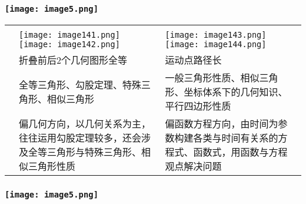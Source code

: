 \hypertarget{ux5b66ux79d1ux7f51www.zxxk.com--ux6559ux80b2ux8d44ux6e90ux95e8ux6237ux63d0ux4f9bux8bd5ux9898ux8bd5ux5377ux6559ux6848ux8bfeux4ef6ux6559ux5b66ux8bbaux6587ux7d20ux6750ux7b49ux5404ux7c7bux6559ux5b66ux8d44ux6e90ux5e93ux4e0bux8f7dux8fd8ux6709ux5927ux91cfux4e30ux5bccux7684ux6559ux5b66ux8d44ux8baf-26}{%
\subsubsection{\texorpdfstring{\protect\texttt{[image: image5.png]}}{学科网(www.zxxk.com)-\/-教育资源门户，提供试题试卷、教案、课件、教学论文、素材等各类教学资源库下载，还有大量丰富的教学资讯！}}\label{ux5b66ux79d1ux7f51www.zxxk.com--ux6559ux80b2ux8d44ux6e90ux95e8ux6237ux63d0ux4f9bux8bd5ux9898ux8bd5ux5377ux6559ux6848ux8bfeux4ef6ux6559ux5b66ux8bbaux6587ux7d20ux6750ux7b49ux5404ux7c7bux6559ux5b66ux8d44ux6e90ux5e93ux4e0bux8f7dux8fd8ux6709ux5927ux91cfux4e30ux5bccux7684ux6559ux5b66ux8d44ux8baf-26}}

\begin{longtable}[]{@{}lll@{}}
\toprule
\endhead
& &\tabularnewline
& \texttt{[image: image141.png]}
\texttt{[image: image142.png]}
&
\texttt{[image: image143.png]}
\texttt{[image: image144.png]}\tabularnewline
& 折叠前后2个几何图形全等 & 运动点路径长\tabularnewline
& 全等三角形、勾股定理、特殊三角形、相似三角形 &
一般三角形性质、相似三角形、坐标体系下的几何知识、平行四边形性质\tabularnewline
&
偏几何方向，以几何关系为主，往往运用勾股定理较多，还会涉及全等三角形与特殊三角形、相似三角形性质
&
偏函数方程方向，由时间为参数构建各类与时间有关系的方程式、函数式，用函数与方程观点解决问题\tabularnewline
\bottomrule
\end{longtable}

\hypertarget{section-21}{%
\subsubsection{}\label{section-21}}

\hypertarget{ux5b66ux79d1ux7f51www.zxxk.com--ux6559ux80b2ux8d44ux6e90ux95e8ux6237ux63d0ux4f9bux8bd5ux9898ux8bd5ux5377ux6559ux6848ux8bfeux4ef6ux6559ux5b66ux8bbaux6587ux7d20ux6750ux7b49ux5404ux7c7bux6559ux5b66ux8d44ux6e90ux5e93ux4e0bux8f7dux8fd8ux6709ux5927ux91cfux4e30ux5bccux7684ux6559ux5b66ux8d44ux8baf-27}{%
\subsubsection{\texorpdfstring{\protect\texttt{[image: image5.png]}}{学科网(www.zxxk.com)-\/-教育资源门户，提供试题试卷、教案、课件、教学论文、素材等各类教学资源库下载，还有大量丰富的教学资讯！}}\label{ux5b66ux79d1ux7f51www.zxxk.com--ux6559ux80b2ux8d44ux6e90ux95e8ux6237ux63d0ux4f9bux8bd5ux9898ux8bd5ux5377ux6559ux6848ux8bfeux4ef6ux6559ux5b66ux8bbaux6587ux7d20ux6750ux7b49ux5404ux7c7bux6559ux5b66ux8d44ux6e90ux5e93ux4e0bux8f7dux8fd8ux6709ux5927ux91cfux4e30ux5bccux7684ux6559ux5b66ux8d44ux8baf-27}}

